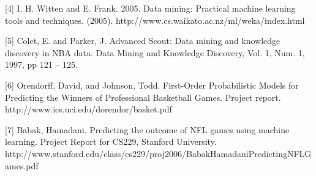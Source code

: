 \documentclass{article}
\begin{document}
[4] I. H. Witten and E. Frank. 2005. Data mining: Practical machine learning tools and techniques. (2005). http://www.cs.waikato.ac.nz/ml/weka/index.html

[5] Colet, E. and Parker, J. Advanced Scout: Data mining and knowledge discovery in NBA data. Data Mining and Knowledge Discovery, Vol. 1, Num. 1, 1997, pp 121 -- 125.

[6] Orendorff, David, and Johnson, Todd. First-Order Probabilistic Models for Predicting the Winners of Professional Basketball Games. Project report. http://www.ics.uci.edu/dorendor/basket.pdf

[7] Babak, Hamadani. Predicting the outcome of NFL games using machine learning. Project Report for CS229, Stanford University. http://www.stanford.edu/class/cs229/proj2006/BabakHamadaniPredictingNFLGames.pdf
\end{document}
